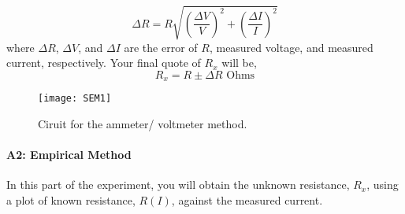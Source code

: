 \documentclass[twocolumn,a4paper,11pt]{article}
\begin{document}
\begin{equation}
\Delta R = R\sqrt{\left(\frac{\Delta V}{V}\right)^2 + \left(\frac{\Delta I}{I}\right)^2} \tag{7}
\end{equation}
where \(\Delta R\), \(\Delta V\), and \(\Delta I\) are the error of \(R\), measured voltage, and measured current, respectively. Your final quote of \(R_x\) will be,
\[
R_x = R \pm \Delta R \text{ Ohms}
\]

\begin{figure}[htbp]
\centering
\texttt{[image: SEM1]}
\caption{Ciruit for the ammeter/ voltmeter method.}
\label{6}
\end{figure}
\paragraph{A2: Empirical Method}
In this part of the experiment, you will obtain the unknown resistance, \(R_x\), using a plot of known resistance, \(R(I)\), against the measured current.
\end{document}
